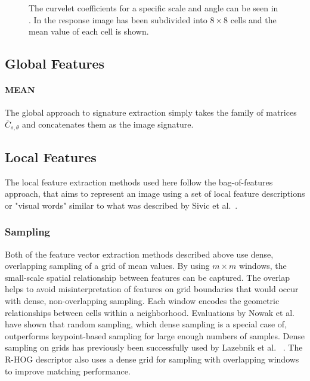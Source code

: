 \begin{figure}[h]
    \centering
    \quad
    \caption[Curvelet coefficients and means]{
        The curvelet coefficients for a specific scale and angle can be seen in
        . In
         the response image has
        been subdivided into $8 \times 8$ cells and the mean value of each cell
        is shown.
    }
    \label{fig:signature_examples}
\end{figure}

\subsection{Global Features}\label{sec:solution_signature_extraction_global}

\paragraph{MEAN}

The global approach to signature extraction simply takes the family of matrices
$\bar{C}_{s, \theta}$ and concatenates them as the image signature.

\subsection{Local Features}\label{sec:solution_signature_extraction_local}

The local feature extraction methods used here follow the bag-of-features
approach, that aims to represent an image using a set of local feature
descriptions or "visual words" similar to what was described by Sivic et al.\ 
\autocite{sivic_video_2003}. 

\subsubsection{Sampling}

Both of the feature vector extraction methods described above use dense,
overlapping sampling of a grid of mean values. By using $m \times m$ windows,
the small-scale spatial relationship between features can be captured. The
overlap helps to avoid misinterpretation of features on grid boundaries that
would occur with dense, non-overlapping sampling. Each window encodes the
geometric relationships between cells within a neighborhood. 
Evaluations by Nowak et al.\ \autocite{nowak_sampling_2006} have shown that
random sampling, which dense sampling is a special case of, outperforms
keypoint-based sampling for large enough numbers of samples. Dense sampling on
grids has previously been successfully used by Lazebnik et al.\
\autocite{lazebnik_beyond_2006} \autocite{lazebnik_spatial_2009}. The R-HOG
descriptor \autocite{dalal_histograms_2005} also uses a dense grid for sampling
with overlapping windows to improve matching performance.

